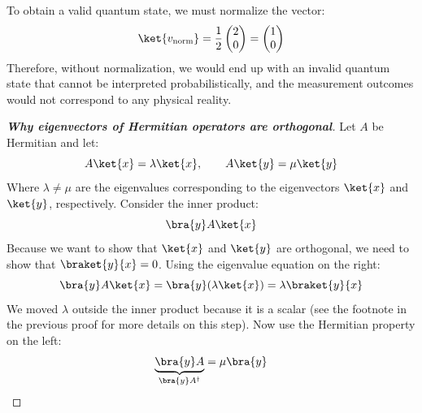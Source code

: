 \begin{enumerate}
\begin{itemize}
\begin{examplebox}
            \highspace
            To obtain a valid quantum state, we must normalize the vector:
            \begin{equation*}
                \ket{v_{\text{norm}}}
                =
                \frac{1}{2}
                \begin{pmatrix}
                    2 \\
                    0
                \end{pmatrix}
                =
                \begin{pmatrix}
                    1 \\
                    0
                \end{pmatrix}
            \end{equation*}
            Therefore, without normalization, we would end up with an invalid quantum state that cannot be interpreted probabilistically, and the measurement outcomes would not correspond to any physical reality.
        \end{examplebox} 
    \end{itemize}
    \begin{proof}[\textbf{Why eigenvectors of Hermitian operators are orthogonal}]
        Let $A$ be Hermitian and let:
        \begin{equation*}
            A\ket{x} = \lambda \ket{x}, \qquad A\ket{y} = \mu \ket{y}
        \end{equation*}
        Where $\lambda \ne \mu$ are the eigenvalues corresponding to the eigenvectors $\ket{x}$ and $\ket{y}$, respectively. Consider the inner product:
        \begin{equation*}
            \bra{y} A \ket{x}
        \end{equation*}
        Because we want to show that $\ket{x}$ and $\ket{y}$ are orthogonal, we need to show that $\braket{y}{x} = 0$.
        Using the eigenvalue equation on the right:
        \begin{equation*}
            \bra{y} A \ket{x}
            =
            \bra{y} (\lambda \ket{x})
            =
            \lambda \braket{y}{x}
        \end{equation*}
        We moved $\lambda$ outside the inner product because it is a scalar (see the footnote in the previous proof for more details on this step).
        Now use the Hermitian property on the left:
        \begin{equation*}
            \underbrace{\bra{y} A }_{\bra{y} A^\dagger} = \mu \bra{y}
        \end{equation*}

\end{proof}
\end{enumerate}

